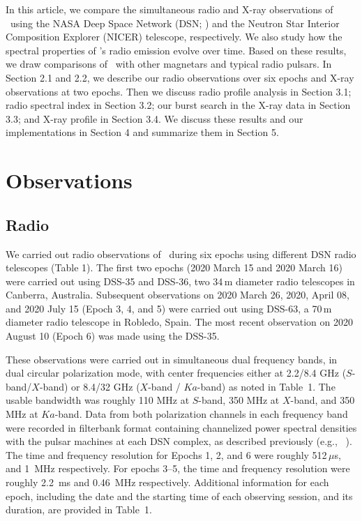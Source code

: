 \documentclass[twocolumn]{emulateapj}
\begin{document}
In this article, we compare the simultaneous radio and X-ray observations of \jmag\ using 
the NASA Deep Space Network (DSN; \citealt{pearlman2019b}) and the Neutron Star Interior 
Composition Explorer (NICER) telescope, respectively. We also study how the spectral 
properties of \jmag's radio emission evolve over time. Based on these results, we draw 
comparisons of \jmag\ with other magnetars and typical radio pulsars. In Section 2.1 and 2.2, 
we describe our radio observations over six epochs and X-ray observations at two epochs. 
Then we discuss radio profile analysis in Section 3.1; radio spectral index in Section 3.2; 
our burst search in the X-ray data in Section 3.3; and X-ray profile in Section 3.4. 
We discuss these results and our implementations in Section 4 and summarize them in 
Section 5.

\section{Observations}
\label{sec:obs}
\subsection{Radio}
\label{ssec:radio_obs}
We carried out radio observations of \jmag\ during six epochs using different DSN radio 
telescopes (Table 1). The first two epochs (2020 March 15 and 2020 March 16) were carried 
out using DSS-35 and DSS-36, two 34\,m diameter radio telescopes in Canberra, Australia. 
Subsequent observations on 2020 March 26, 2020, April 08, and 2020 July 15 (Epoch 3, 4, and 5) 
were carried out using DSS-63, a 70\,m diameter radio telescope in Robledo, Spain. The most 
recent observation on 2020 August 10 (Epoch 6) was made using the DSS-35.

These observations were carried out in simultaneous dual frequency bands, in dual circular 
polarization mode, with center frequencies either at 2.2/8.4 GHz ($S$-band/$X$-band) or 
8.4/32 GHz ($X$-band / $Ka$-band) as noted in Table~1. The usable bandwidth was roughly 
110 MHz at $S$-band, 350 MHz at $X$-band, and 350 MHz at $Ka$-band. Data from both polarization 
channels in each frequency band were recorded in filterbank format containing channelized 
power spectral densities with the pulsar machines at each DSN complex, as described 
previously (e.g., ~\citealt{pearlman2018, pearlman2019b, Majid+2020, pearlman2020bright}). 
The time and frequency resolution for Epochs 1, 2, and 6 were roughly 512\,$\mu$s, and 
1\, MHz respectively. For epochs 3--5, the time and frequency resolution were roughly 
2.2\, ms and 0.46\, MHz respectively. Additional information for each epoch, including 
the date and the starting time of each observing session, and its duration, are 
provided in Table~1.
\end{document}
